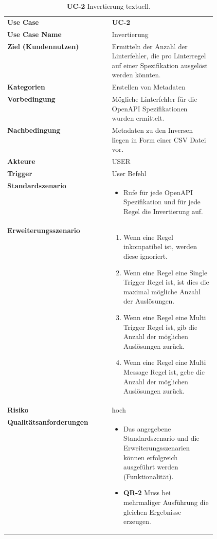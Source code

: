\begin{longtable}{lp{0.5\linewidth}}
  \caption{\textbf{UC-2} Invertierung textuell.}
  \endfirsthead
  \endhead
  \hline\hline
  \textbf{Use Case} & \textbf{UC-2} \\ 
  \textbf{Use Case Name} & Invertierung \\
  \textbf{Ziel (Kundennutzen)} & Ermitteln der Anzahl der Linterfehler, die pro Linterregel auf einer Spezifikation ausgelöst werden könnten. \\
  \textbf{Kategorien} & Erstellen von Metadaten \\
  \textbf{Vorbedingung} & Mögliche Linterfehler für die OpenAPI Spezifikationen wurden ermittelt. \\
  \textbf{Nachbedingung} & Metadaten zu den Inversen liegen in Form einer \acs{CSV} Datei vor. \\
  \textbf{Akteure} & USER \\
  \textbf{Trigger} & User Befehl \\
  \textbf{Standardszenario} & 
  \vspace{-0.7cm}
  \begin{itemize}
    \item Rufe für jede OpenAPI Spezifikation und für jede Regel die Invertierung auf.
  \end{itemize}
  \\
  \textbf{Erweiterungsszenario} & 
  \vspace{-0.7cm}
  \begin{enumerate}
    \item Wenn eine Regel inkompatibel ist, werden diese ignoriert.
    \item Wenn eine Regel eine Single Trigger Regel ist, ist dies die maximal mögliche Anzahl der Auslösungen.
    \item Wenn eine Regel eine Multi Trigger Regel ist, gib die Anzahl der möglichen Auslösungen zurück.
    \item Wenn eine Regel eine Multi Message Regel ist, gebe die Anzahl der möglichen Auslösungen zurück.
  \end{enumerate}
  \\
  \textbf{Risiko} & \hspace{0.8cm} hoch \\
  \textbf{Qualitätsanforderungen} & 
  \vspace{-0.7cm}
  \begin{itemize}
    \item Das angegebene Standardszenario und die Erweiterungsszenarien können erfolgreich ausgeführt werden (Funktionalität).
    \item \textbf{QR-2} Muss bei mehrmaliger Ausführung die gleichen Ergebnisse erzeugen.
  \end{itemize}
   \\ \hline\hline
\end{longtable}
